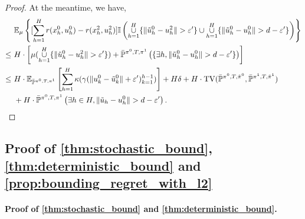 \documentclass{article}
\let\oldparagraph\paragraph
\renewcommand{\paragraph}[1]{\oldparagraph{#1.}}
\begin{document}
\begin{proof}
At the meantime, we have,
\begin{align*}
     &~ \mathbb E_\mu\left\{[\sum_{h=1}^H r(x_h^0, u_h^0)-r(x_h^2, u_h^2)]\mathbb I\left( \mathop{\cup}_{h=1}^H \{\|\tilde u_h^0-u_h^2\|> \varepsilon^\prime\} \cup \mathop{\cup}_{h=1}^H \{\|\tilde u_h^0-u_h^0\|> d-\varepsilon^\prime\}\right)\right\}\\
     \leq &~ H\cdot \left [\mu(\mathop{\cup}_{h=1}^H \{\|\tilde u_h^0-u_h^2\|> \varepsilon^\prime\})+\bar {\mathbb P}^{\pi^0, T, \pi^1}\left(\{\exists h, \|\tilde u_h^0-u_h^0\|>d-\varepsilon^\prime\}\right)\right]\\
     \leq &~ H\cdot \mathbb E_{\bar {\mathbb P}^{\pi^0, T, \pi^1}}\left[\sum_{h=1}^H\kappa(\gamma(\|u_k^0-\tilde u_k^0\| + \varepsilon^\prime)_{k=1}^{h-1})\right] + H\delta+H\cdot \textnormal{TV}(\bar {\mathbb P}^{\pi^0,T,\tilde \pi^0},\bar {\mathbb P}^{\pi^1,T,\tilde \pi^1})\\
     &~ + H\cdot \bar{\mathbb P}^{\pi^0, T, \pi^1}\left(\exists h\in H, \|\tilde u_h-u_h^0\|>d-\varepsilon^\prime\right). \qedhere
\end{align*}

\end{proof}


\subsection{Proof of 
\texorpdfstring{\cref{thm:stochastic_bound}}{Theorem 2}, \texorpdfstring{\cref{thm:deterministic_bound}}{Theorem 3} and \texorpdfstring{\cref{prop:bounding_regret_with_l2}}{Proposition 4}}


\paragraph{Proof of \cref{thm:stochastic_bound} and \cref{thm:deterministic_bound}}
\end{document}
